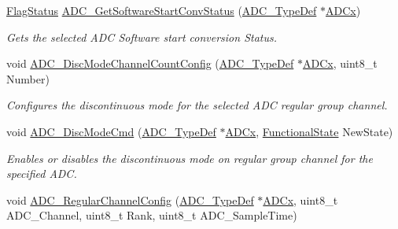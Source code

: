 \begin{DoxyCompactItemize}
\mbox{\hyperlink{group___exported__types_ga89136caac2e14c55151f527ac02daaff}{Flag\+Status}} \mbox{\hyperlink{group___a_d_c___private___functions_gaf1119583782ecbcec380efcb7eb74883}{A\+D\+C\+\_\+\+Get\+Software\+Start\+Conv\+Status}} (\mbox{\hyperlink{struct_a_d_c___type_def}{A\+D\+C\+\_\+\+Type\+Def}} $\ast$\mbox{\hyperlink{group___s_t_m32_f1_x_x___n_u_c_l_e_o___l_o_w___l_e_v_e_l___exported___constants_gab44c1065d38c298955fc028346984340}{A\+D\+Cx}})
\begin{DoxyCompactList}\small\item\em Gets the selected A\+DC Software start conversion Status. \end{DoxyCompactList}\item 
void \mbox{\hyperlink{group___a_d_c___private___functions_ga6eb241ba82d67d1371136c9132083937}{A\+D\+C\+\_\+\+Disc\+Mode\+Channel\+Count\+Config}} (\mbox{\hyperlink{struct_a_d_c___type_def}{A\+D\+C\+\_\+\+Type\+Def}} $\ast$\mbox{\hyperlink{group___s_t_m32_f1_x_x___n_u_c_l_e_o___l_o_w___l_e_v_e_l___exported___constants_gab44c1065d38c298955fc028346984340}{A\+D\+Cx}}, uint8\+\_\+t Number)
\begin{DoxyCompactList}\small\item\em Configures the discontinuous mode for the selected A\+DC regular group channel. \end{DoxyCompactList}\item 
void \mbox{\hyperlink{group___a_d_c___private___functions_ga1909649d10253ce88d986ffbb94a4be6}{A\+D\+C\+\_\+\+Disc\+Mode\+Cmd}} (\mbox{\hyperlink{struct_a_d_c___type_def}{A\+D\+C\+\_\+\+Type\+Def}} $\ast$\mbox{\hyperlink{group___s_t_m32_f1_x_x___n_u_c_l_e_o___l_o_w___l_e_v_e_l___exported___constants_gab44c1065d38c298955fc028346984340}{A\+D\+Cx}}, \mbox{\hyperlink{group___exported__types_gac9a7e9a35d2513ec15c3b537aaa4fba1}{Functional\+State}} New\+State)
\begin{DoxyCompactList}\small\item\em Enables or disables the discontinuous mode on regular group channel for the specified A\+DC. \end{DoxyCompactList}\item 
void \mbox{\hyperlink{group___a_d_c___private___functions_gac531adb577b648d4bb8881f2ed627d52}{A\+D\+C\+\_\+\+Regular\+Channel\+Config}} (\mbox{\hyperlink{struct_a_d_c___type_def}{A\+D\+C\+\_\+\+Type\+Def}} $\ast$\mbox{\hyperlink{group___s_t_m32_f1_x_x___n_u_c_l_e_o___l_o_w___l_e_v_e_l___exported___constants_gab44c1065d38c298955fc028346984340}{A\+D\+Cx}}, uint8\+\_\+t A\+D\+C\+\_\+\+Channel, uint8\+\_\+t Rank, uint8\+\_\+t A\+D\+C\+\_\+\+Sample\+Time)

\end{DoxyCompactItemize}
